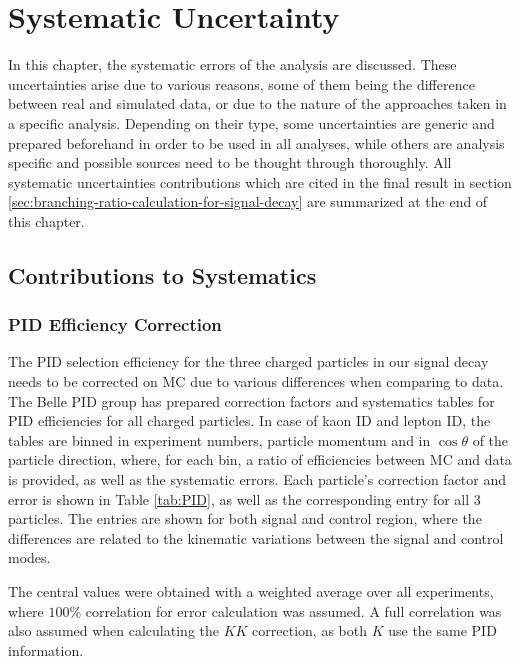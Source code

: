 \chapter{Systematic Uncertainty}\label{sec:systematic-uncertainty}
In this chapter, the systematic errors of the analysis are discussed. These uncertainties arise due to various reasons, some of them being the difference between real and simulated data, or due to the nature of the approaches taken in a specific analysis. Depending on their type, some uncertainties are generic and prepared beforehand in order to be used in all analyses, while others are analysis specific and possible sources need to be thought through thoroughly. All systematic uncertainties contributions which are cited in the final result in section \ref{sec:branching-ratio-calculation-for-signal-decay} are summarized at the end of this chapter.

\section{Contributions to Systematics}

\subsection{PID Efficiency Correction}\label{sec:pid-efficiency-correction}

The PID selection efficiency for the three charged particles in our signal decay needs to be corrected on MC due to various differences when comparing to data. The Belle PID group has prepared correction factors and systematics tables for PID efficiencies for all charged particles. In case of kaon ID and lepton ID, the tables are binned in experiment numbers, particle momentum and in $\cos\theta$ of the particle direction, where, for each bin, a ratio of efficiencies between MC and data is provided, as well as the systematic errors. Each particle's correction factor and error is shown in Table \ref{tab:PID}, as well as the corresponding entry for all 3 particles. The entries are shown for both signal and control region, where the differences are related to the kinematic variations between the signal and control modes.

The central values were obtained with a weighted average over all experiments, where $100\%$ correlation for error calculation was assumed. A full correlation was also assumed when calculating the $KK$ correction, as both $K$ use the same PID information.

